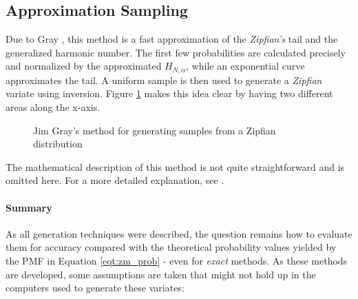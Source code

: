 \vspace{0.2cm}
\vspace{0.2cm}

\subsection{Approximation Sampling}\label{subsec:jim_gray}
Due to Gray \cite{grayQuicklyGeneratingBillionrecord1994}, this method is a fast approximation of the \textit{Zipfian's} tail and the generalized harmonic number.
The first few probabilities are calculated precisely and normalized by the approximated $H_{N,\alpha}$, while an exponential curve approximates the tail. 
A uniform sample is then used to generate a \textit{Zipfian} variate using inversion.
Figure \ref{fig:jim_gray} makes this idea clear by having two different areas along the x-axis. 

\begin{figure}[h]
    \centering
    
    \caption{Jim Gray's method for generating samples from a Zipfian distribution}\label{fig:jim_gray}
\end{figure}

The mathematical description of this method is not quite straightforward and is omitted here. For a more detailed explanation, see \cite{grayQuicklyGeneratingBillionrecord1994,knuthArtComputerProgramming1997}.

\paragraph{Summary} As all generation techniques were described, the question remains how to evaluate them for accuracy compared with 
the theoretical probability values yielded by the \ac{PMF} in Equation \ref{eqt:zm_prob} - even for \textit{exact} methods. As these methods are developed, some assumptions
\cite{leydoldErrorDetectionNonUniforma} are taken that might not hold up in the computers used to generate these variates:

